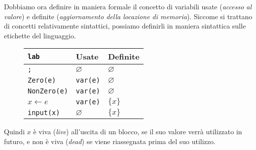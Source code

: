 Dobbiamo ora definire in maniera formale il concetto di variabili usate (\textit{accesso
al valore})
e definite (\textit{aggiornamento della locazione di memoria}). Siccome 
si trattano di concetti relativamente sintattici, possiamo definirli in maniera sintattica 
sulle etichette del linguaggio.

\begin{figure}[H]
    \centering
    \begin{tabular}{l|l|l}
    \texttt{lab} & Usate & Definite\\
    \hline
    \texttt{;} & $\varnothing$ & $\varnothing$\\
    \texttt{Zero(e)} & \texttt{var(e)}& $\varnothing$\\
    \texttt{NonZero(e)} & \texttt{var(e)}& $\varnothing$\\
    \texttt{$x \gets e$} & \texttt{var(e)}& $\{x\}$\\
    \texttt{\texttt{input(x)}} & $\varnothing$ & $\{x\}$\\
    \end{tabular}
\end{figure}
Quindi $x$ è viva (\textit{live}) all'uscita di un blocco, se il suo valore verrà utilizzato in 
futuro, e non è viva (\textit{dead}) se viene riassegnata prima del suo utilizzo.

